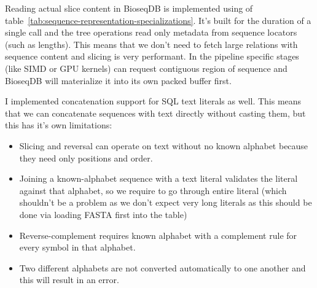 Reading actual slice content in BioseqDB is implemented using 
 of
table~\ref{tab:sequence-representation-specializations}. It's built for the
duration of a single call and the tree operations read only metadata from sequence locators (such as lengths). This means that we don't need to fetch large relations with sequence content and slicing is very performant.
In the pipeline specific stages (like SIMD or GPU kernels) can request contiguous region of sequence and BioseqDB will materialize it into its own packed buffer first.

I implemented concatenation support for SQL text literals as well. This means that we can concatenate sequences with text directly without casting them, but this has it's own limitations:
\begin{itemize}
  \item Slicing and reversal can operate on text without no known alphabet because they need
        only positions and order.
  \item Joining a known-alphabet sequence with a text literal validates the literal
        against that alphabet, so we require to go through entire literal (which shouldn't be a problem as we don't expect very long literals as this should be done via loading FASTA first into the table)
  \item Reverse-complement requires known alphabet with a complement rule
        for every symbol in that alphabet.
  \item Two different alphabets are not converted automatically to one another and this will result in an error.
\end{itemize}

